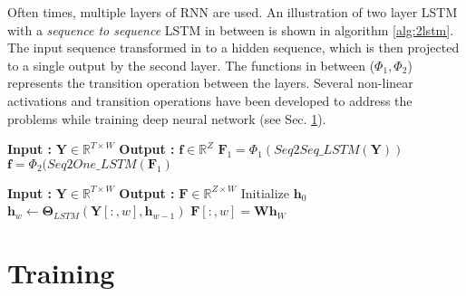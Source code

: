 \noindent Often times, multiple layers of RNN are used. An illustration of  two layer LSTM with a \textit{sequence to sequence} LSTM in between is shown in algorithm \ref{alg:2lstm}. The input sequence transformed in to a hidden sequence, which is then projected to a single output by the second layer. The functions in between ($\Phi_{1}, \Phi_{2}$) represents the transition operation between the layers. Several non-linear activations and transition operations have been developed to address the problems while training deep neural network (see Sec. \ref{training}). 
  
\begin{minipage}[t]{7.5cm}
  \vspace{0pt}  
\begin{algorithm}[H]
  \caption{$\textbf{f}$ = $LSTM2(\textbf{Y})$}\label{alg:2lstm}
  \begin{algorithmic}[1]
    \Statex \textbf{Input :} $\textbf{Y} \in \mathbb{R}^{T \times W}$
    \Statex \textbf{Output :} $\textbf{f} \in \mathbb{R}^{Z}$
    \Statex
    \Statex
    \Statex
    \State $\textbf{F}_{1} = \Phi_{1}(Seq2Seq\_LSTM(\textbf{Y}))$
    \State $\textbf{f} = \Phi_{2}(Seq2One\_LSTM(\textbf{F}_{1})$
  \end{algorithmic}
\end{algorithm}
\end{minipage}%
\begin{minipage}[t]{7.5cm}
  \vspace{0pt}
\begin{algorithm}[H]
  \caption{$\textbf{F}$ = $Seq2Seq\_LSTM$($\textbf{Y}$) }\label{alg:s2slstm}
  \begin{algorithmic}[1]
    \Statex \textbf{Input :} $\textbf{Y} \in \mathbb{R}^{T \times W}$
    \Statex \textbf{Output :} $\textbf{F} \in \mathbb{R}^{Z \times W}$
    \State Initialize $\textbf{h}_{0}$
    \State  $\textbf{h}_{w} \leftarrow \bm{\Theta}_{LSTM}(\textbf{Y}[:,w],\textbf{h}_{w-1})$
    \State $\textbf{F}[:,w] = \textbf{W}\textbf{h}_{W}$
    \EndFor
  \end{algorithmic}
\end{algorithm}
\end{minipage}
\FloatBarrier
{\color{gray}
\section{Training}
\label{training}
}
